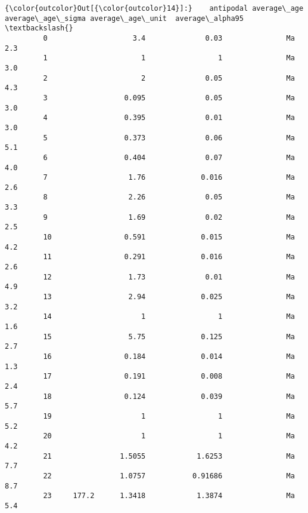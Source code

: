 \documentclass{article}
\begin{document}
            \begin{Verbatim}[commandchars=\\\{\}]
{\color{outcolor}Out[{\color{outcolor}14}]:}    antipodal average\_age average\_age\_sigma average\_age\_unit  average\_alpha95  \textbackslash{}
         0                    3.4              0.03               Ma              2.3   
         1                      1                 1               Ma              3.0   
         2                      2              0.05               Ma              4.3   
         3                  0.095              0.05               Ma              3.0   
         4                  0.395              0.01               Ma              3.0   
         5                  0.373              0.06               Ma              5.1   
         6                  0.404              0.07               Ma              4.0   
         7                   1.76             0.016               Ma              2.6   
         8                   2.26              0.05               Ma              3.3   
         9                   1.69              0.02               Ma              2.5   
         10                 0.591             0.015               Ma              4.2   
         11                 0.291             0.016               Ma              2.6   
         12                  1.73              0.01               Ma              4.9   
         13                  2.94             0.025               Ma              3.2   
         14                     1                 1               Ma              1.6   
         15                  5.75             0.125               Ma              2.7   
         16                 0.184             0.014               Ma              1.3   
         17                 0.191             0.008               Ma              2.4   
         18                 0.124             0.039               Ma              5.7   
         19                     1                 1               Ma              5.2   
         20                     1                 1               Ma              4.2   
         21                1.5055            1.6253               Ma              7.7   
         22                1.0757           0.91686               Ma              8.7   
         23     177.2      1.3418            1.3874               Ma              5.4   
         

\end{Verbatim}
\end{document}
